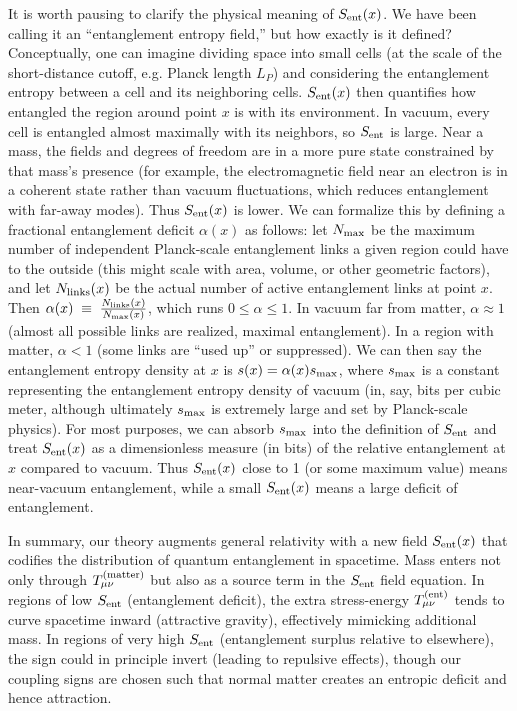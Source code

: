\documentclass[11pt]{article}
\begin{document}
It is worth pausing to clarify the physical meaning of $S_{\rm ent}(x)$. We have been calling it an “entanglement entropy field,” but how exactly is it defined? Conceptually, one can imagine dividing space into small cells (at the scale of the short-distance cutoff, e.g. Planck length $L_P$) and considering the entanglement entropy between a cell and its neighboring cells. $S_{\rm ent}(x)$ then quantifies how entangled the region around point $x$ is with its environment. In vacuum, every cell is entangled almost maximally with its neighbors, so $S_{\rm ent}$ is large. Near a mass, the fields and degrees of freedom are in a more pure state constrained by that mass’s presence (for example, the electromagnetic field near an electron is in a coherent state rather than vacuum fluctuations, which reduces entanglement with far-away modes). Thus $S_{\rm ent}(x)$ is lower. We can formalize this by defining a fractional entanglement deficit $\alpha(x)$ as follows: let $N_{\rm max}$ be the maximum number of independent Planck-scale entanglement links a given region could have to the outside (this might scale with area, volume, or other geometric factors), and let $N_{\rm links}(x)$ be the actual number of active entanglement links at point $x$. Then $\alpha(x) \;\equiv\; \frac{N_{\rm links}(x)}{N_{\rm max}(x)}$, which runs $0 \le \alpha \le 1$. In vacuum far from matter, $\alpha \approx 1$ (almost all possible links are realized, maximal entanglement). In a region with matter, $\alpha < 1$ (some links are “used up” or suppressed). We can then say the entanglement entropy density at $x$ is $s(x) = \alpha(x) s_{\rm max}$, where $s_{\rm max}$ is a constant representing the entanglement entropy density of vacuum (in, say, bits per cubic meter, although ultimately $s_{\rm max}$ is extremely large and set by Planck-scale physics). For most purposes, we can absorb $s_{\rm max}$ into the definition of $S_{\rm ent}$ and treat $S_{\rm ent}(x)$ as a dimensionless measure (in bits) of the relative entanglement at $x$ compared to vacuum. Thus $S_{\rm ent}(x)$ close to 1 (or some maximum value) means near-vacuum entanglement, while a small $S_{\rm ent}(x)$ means a large deficit of entanglement.

In summary, our theory augments general relativity with a new field $S_{\rm ent}(x)$ that codifies the distribution of quantum entanglement in spacetime. Mass enters not only through $T_{\mu\nu}^{\rm (matter)}$ but also as a source term in the $S_{\rm ent}$ field equation. In regions of low $S_{\rm ent}$ (entanglement deficit), the extra stress-energy $T_{\mu\nu}^{\rm (ent)}$ tends to curve spacetime inward (attractive gravity), effectively mimicking additional mass. In regions of very high $S_{\rm ent}$ (entanglement surplus relative to elsewhere), the sign could in principle invert (leading to repulsive effects), though our coupling signs are chosen such that normal matter creates an entropic deficit and hence attraction.
\end{document}

